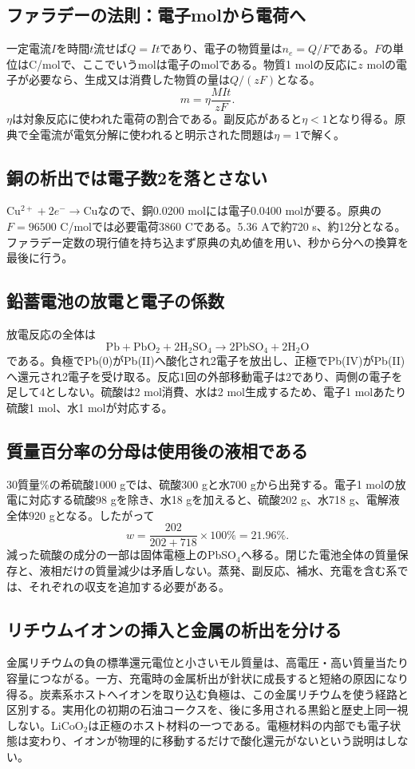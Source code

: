 \subsection{ファラデーの法則：電子molから電荷へ}
\label{theory:electrochem:faraday}
一定電流$I$を時間$t$流せば$Q=It$であり、電子の物質量は$n_e=Q/F$である。$F$の単位はC/molで、ここでいうmolは電子のmolである。物質1 molの反応に$z$ molの電子が必要なら、生成又は消費した物質の量は$Q/(zF)$となる\cite{mit_redox2014}。
\[
 m=\eta\frac{MIt}{zF} .
\]
$\eta$は対象反応に使われた電荷の割合である。副反応があると$\eta<1$となり得る。原典で全電流が電気分解に使われると明示された問題は$\eta=1$で解く。

\subsection{銅の析出では電子数2を落とさない}
\label{theory:electrochem:copper}
Cu$^{2+}+2e^-\to$Cuなので、銅0.0200 molには電子0.0400 molが要る。原典の$F=96500$ C/molでは必要電荷3860 Cである。5.36 Aで約720 s、約12分となる。ファラデー定数の現行値を持ち込まず原典の丸め値を用い、秒から分への換算を最後に行う。

\subsection{鉛蓄電池の放電と電子の係数}
\label{theory:electrochem:lead}
放電反応の全体は
\[
 \mathrm{Pb+PbO_2+2H_2SO_4\longrightarrow2PbSO_4+2H_2O}
\]
である\cite{openstax_batteries}。負極でPb(0)がPb(II)へ酸化され2電子を放出し、正極でPb(IV)がPb(II)へ還元され2電子を受け取る。反応1回の外部移動電子は2であり、両側の電子を足して4としない。硫酸は2 mol消費、水は2 mol生成するため、電子1 molあたり硫酸1 mol、水1 molが対応する。

\subsection{質量百分率の分母は使用後の液相である}
\label{theory:electrochem:solution_mass}
30質量\%の希硫酸1000 gでは、硫酸300 gと水700 gから出発する。電子1 molの放電に対応する硫酸98 gを除き、水18 gを加えると、硫酸202 g、水718 g、電解液全体920 gとなる。したがって
\[
 w=\frac{202}{202+718}\times100\%=21.96\% .
\]
減った硫酸の成分の一部は固体電極上のPbSO$_4$へ移る。閉じた電池全体の質量保存と、液相だけの質量減少は矛盾しない。蒸発、副反応、補水、充電を含む系では、それぞれの収支を追加する必要がある。

\subsection{リチウムイオンの挿入と金属の析出を分ける}
\label{theory:electrochem:lithium}
金属リチウムの負の標準還元電位と小さいモル質量は、高電圧・高い質量当たり容量につながる。一方、充電時の金属析出が針状に成長すると短絡の原因になり得る。炭素系ホストへイオンを取り込む負極は、この金属リチウムを使う経路と区別する。実用化の初期の石油コークスを、後に多用される黒鉛と歴史上同一視しない。LiCoO$_2$は正極のホスト材料の一つである\cite{nobel_lithium2019}。電極材料の内部でも電子状態は変わり、イオンが物理的に移動するだけで酸化還元がないという説明はしない。

